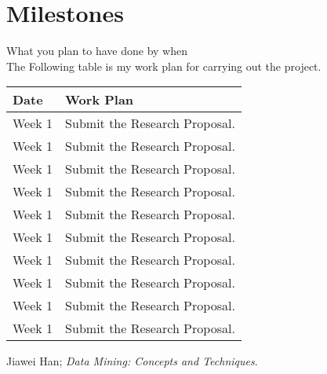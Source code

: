 \documentclass{article}
\begin{document}
\section{Milestones}
What you plan to have done by when\\
The Following table is my work plan for carrying out the project.
\begin{center}
    \begin{tabular}{ | l |p{5cm} |}
    \hline
    Date & Work Plan \\ \hline
		Week 1 & Submit the Research Proposal.\\\hline
				Week 1 & Submit the Research Proposal.\\\hline
						Week 1 & Submit the Research Proposal.\\\hline
								Week 1 & Submit the Research Proposal.\\\hline
										Week 1 & Submit the Research Proposal.\\\hline
												Week 1 & Submit the Research Proposal.\\\hline
														Week 1 & Submit the Research Proposal.\\\hline
																Week 1 & Submit the Research Proposal.\\\hline
																		Week 1 & Submit the Research Proposal.\\\hline
																				Week 1 & Submit the Research Proposal.\\\hline
    \end{tabular}
\end{center}

 \begin{thebibliography}{9}
     Jiawei Han; \textit{Data Mining: Concepts and Techniques}.  
\end{thebibliography}
\end{document}

